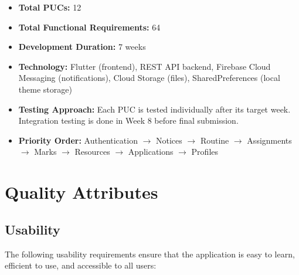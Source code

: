 \documentclass[12pt,a4paper]{article}
\begin{document}
\begin{tcolorbox}[pucbox, title={Overall Completion Plan Summary}]
\begin{itemize}[leftmargin=*, label=\textbullet, itemsep=4pt]
  \item \textbf{Total PUCs:} 12
  \item \textbf{Total Functional Requirements:} 64
  \item \textbf{Development Duration:} 7 weeks
  \item \textbf{Technology:} Flutter (frontend), REST API backend, Firebase Cloud Messaging (notifications), Cloud Storage (files), SharedPreferences (local theme storage)
  \item \textbf{Testing Approach:} Each PUC is tested individually after its target week. Integration testing is done in Week 8 before final submission.
  \item \textbf{Priority Order:} Authentication $\rightarrow$ Notices $\rightarrow$ Routine $\rightarrow$ Assignments $\rightarrow$ Marks $\rightarrow$ Resources $\rightarrow$ Applications $\rightarrow$ Profiles
\end{itemize}
\end{tcolorbox}
\newpage

\newpage
\section{Quality Attributes}

\subsection{Usability}

The following usability requirements ensure that the application is easy to learn, efficient to use, and accessible to all users:
\end{document}
